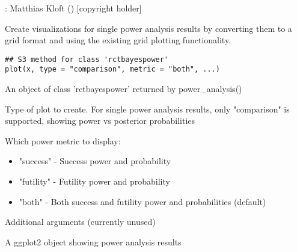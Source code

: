 \documentclass[letterpaper]{book}
\begin{document}
%
\begin{Author}
: Matthias Kloft  () [copyright holder]

\end{Author}
%
\begin{Description}
Create visualizations for single power analysis results by converting them to
a grid format and using the existing grid plotting functionality.
\end{Description}
%
\begin{Usage}
\begin{verbatim}
## S3 method for class 'rctbayespower'
plot(x, type = "comparison", metric = "both", ...)
\end{verbatim}
\end{Usage}
%
\begin{Arguments}
\begin{ldescription}
\item[\code{x}] An object of class 'rctbayespower' returned by power\_analysis()

\item[\code{type}] Type of plot to create. For single power analysis results, only
"comparison" is supported, showing power vs posterior probabilities

\item[\code{metric}] Which power metric to display:
\begin{itemize}

\item{} "success" - Success power and probability
\item{} "futility" - Futility power and probability
\item{} "both" - Both success and futility power and probabilities (default)

\end{itemize}


\item[\code{...}] Additional arguments (currently unused)
\end{ldescription}
\end{Arguments}
%
\begin{Value}
A ggplot2 object showing power analysis results
\end{Value}
%
\end{document}
